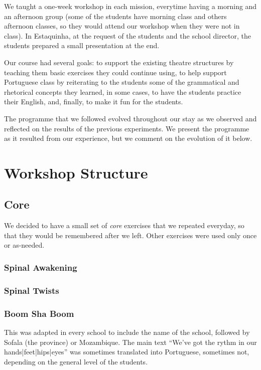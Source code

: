 \documentclass[article,twocolumn,twoside]{memoir}
\begin{document}
We taught a one-week workshop in each mission, everytime having a morning and
an afternoon group (some of the students have morning class and others
afternoon classes, so they would attend our workshop when they were not in
class). In Estaquinha, at the request of the students and the school director,
the students prepared a small presentation at the end.

Our course had several goals: to support the existing theatre structures by
teaching them basic exercises they could continue using, to help support
Portuguese class by reiterating to the students some of the grammatical and
rhetorical concepts they learned, in some cases, to have the students practice
their English, and, finally, to make it fun for the students.

The programme that we followed evolved throughout our stay as we observed and
reflected on the results of the previous experiments. We present the programme
as it resulted from our experience, but we comment on the evolution of it
below.

\chapter{Workshop Structure}

\section{Core}

We decided to have a small set of \textit{core} exercises that we repeated
everyday, so that they would be remembered after we left. Other exercises were
used only once or as-needed.

\subsection{Spinal Awakening}
\subsection{Spinal Twists}
\subsection{Boom Sha Boom}
This was adapted in every school to include the name of the school, followed by
Sofala (the province) or Mozambique. The main text ``We've got the rythm in our
hands|feet|hips|eyes'' was sometimes translated into Portuguese, sometimes not,
depending on the general level of the students.
\end{document}
